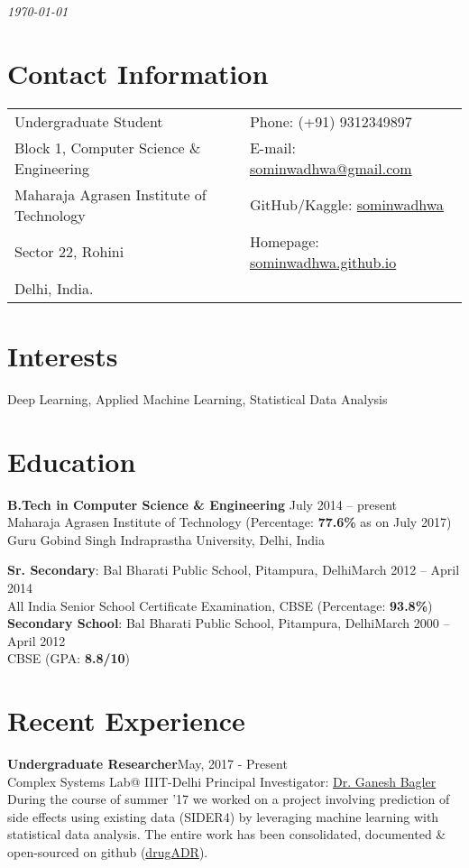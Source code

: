\documentclass[margin,line]{res}
\begin{document}
 \hfill {\em \today}

\begin{resume}
\section{\sc Contact Information}

\vspace{.025in}
\begin{tabular}{@{}p{3.5in}p{3in}}
Undergraduate Student             & {Phone:}  (+91) 9312349897 \\
Block 1, Computer Science \& Engineering 
 & {E-mail:}  \href{mailto:sominwadhwa@gmail.com}{\color{blue}sominwadhwa@gmail.com} \\
Maharaja Agrasen Institute of Technology & {GitHub/Kaggle:} {\href{https://github.com/sominwadhwa}{\color{blue}sominwadhwa}}\\
Sector 22, Rohini & {Homepage:} {\href{sominwadhwa.github.io/}{\color{blue}sominwadhwa.github.io}}\\
Delhi, India.
\end{tabular}

\section{\sc Interests}
Deep Learning, Applied Machine Learning, Statistical Data Analysis

\section{\sc Education}
{\bf B.Tech in Computer Science \& Engineering} \hfill July 2014 -- present\\
Maharaja Agrasen Institute of Technology \hfill(Percentage: {\bf 77.6\%} as on July 2017)\\
Guru Gobind Singh Indraprastha University, Delhi, India

{\bf Sr. Secondary}: Bal Bharati Public School, Pitampura, Delhi\hfill March 2012 -- April 2014\\
All India Senior School Certificate Examination, CBSE \hfill(Percentage: {\bf 93.8\%})\\
{\bf Secondary School}: Bal Bharati Public School, Pitampura, Delhi\hfill March 2000 -- April 2012\\
CBSE \hfill(GPA: {\bf 8.8/10})

\section{\sc Recent Experience}
{\bf Undergraduate Researcher}\hfill May, 2017 - Present\\  
Complex Systems Lab@ IIIT-Delhi \hfill Principal Investigator: {\href{https://scholar.google.co.in/citations?user=qyth_0QAAAAJ&hl=en}{\color{blue} Dr. Ganesh Bagler}}\\
During the course of summer '17 we worked on a project involving prediction of side effects using existing data (SIDER4) by leveraging machine learning with statistical data analysis. The entire work has been consolidated, documented \& open-sourced on github ({\href{https://github.com/sominwadhwa/drugADR}{\color{blue}drugADR}}).


\end{resume}
\end{document}
